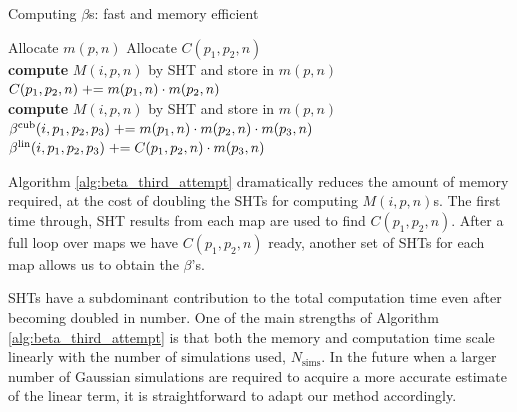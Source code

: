\begin{algorithm}[htbp]
	\caption{Computing $\beta$s: fast and memory efficient}
	\label{alg:beta_third_attempt}
	\begin{algorithmic}[1] %
		\State Allocate $m(p,n)$ 
		\State Allocate $C(p_1,p_2,n)$ 
		\\
				\State \textbf{compute} $M(i,p,n)$ by SHT and store in $m(p,n)$
			\EndFor
			\\
					\State $C(p_1,p_2,n) \mathrel{+}= m(p_1,n) \cdot m(p_2,n)$
				\EndFor
			\EndFor
		\EndFor
		\\
				\State \textbf{compute} $M(i,p,n)$ by SHT and store in $m(p,n)$
			\EndFor
			\\
					\label{alg:thrid_attempt_main_loop}	
					\State $\beta^\text{cub}(i, p_1, p_2, p_3) \mathrel{+}= m(p_1,n) \cdot m(p_2,n) \cdot m(p_3,n)$
					\State $\beta^\text{lin}(i, p_1, p_2, p_3) \mathrel{+}= C(p_1, p_2, n) \cdot m( p_3, n)$
				\EndFor
			\EndFor
		\EndFor
	\end{algorithmic}
\end{algorithm}

Algorithm \ref{alg:beta_third_attempt} dramatically reduces the amount of memory required, at the cost of doubling the SHTs for computing $M(i,p,n)$s. The first time through, SHT results from each map are used to find $C(p_1,p_2,n)$. After a full loop over maps we have $C(p_1,p_2,n)$ ready, another set of SHTs for each map allows us to obtain the $\beta$'s.

SHTs have a subdominant contribution to the total computation time even after becoming doubled in number. One of the main strengths of Algorithm \ref{alg:beta_third_attempt} is that both the memory and computation time scale linearly with the number of simulations used, $N_\text{sims}$. In the future when a larger number of Gaussian simulations are required to acquire a more accurate estimate of the linear term, it is straightforward to adapt our method accordingly.

